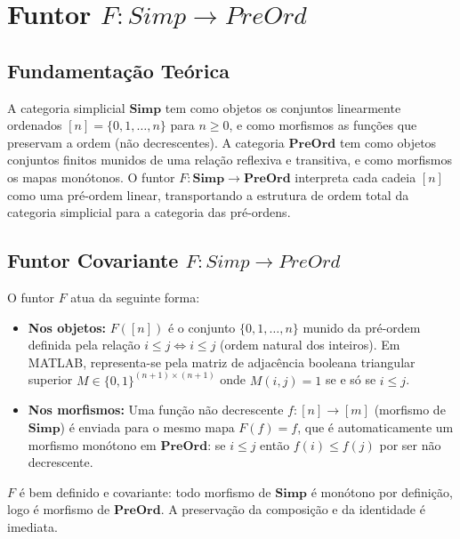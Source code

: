 \section{Funtor \texorpdfstring{$F: Simp \to PreOrd$}{F: Simp -> PreOrd}}
\label{sec:functor-simp-preord}

\subsection{Fundamentação Teórica}

A categoria simplicial $\mathbf{Simp}$ tem como objetos os conjuntos linearmente ordenados $[n] = \{0, 1, \ldots, n\}$ para $n \geq 0$, e como morfismos as funções que preservam a ordem (não decrescentes). A categoria $\mathbf{PreOrd}$ tem como objetos conjuntos finitos munidos de uma relação reflexiva e transitiva, e como morfismos os mapas monótonos. O funtor $F: \mathbf{Simp} \to \mathbf{PreOrd}$ interpreta cada cadeia $[n]$ como uma pré-ordem linear, transportando a estrutura de ordem total da categoria simplicial para a categoria das pré-ordens.

\subsection{Funtor Covariante \texorpdfstring{$F: Simp \to PreOrd$}{F: Simp -> PreOrd}}

\begin{definition}
O funtor $F$ atua da seguinte forma:
\begin{itemize}
    \item \textbf{Nos objetos:} $F([n])$ é o conjunto $\{0, 1, \ldots, n\}$ munido da pré-ordem definida pela relação $i \leq j \iff i \leq j$ (ordem natural dos inteiros). Em MATLAB, representa-se pela matriz de adjacência booleana triangular superior $M \in \{0,1\}^{(n+1) \times (n+1)}$ onde $M(i,j) = 1$ se e só se $i \leq j$.
    \item \textbf{Nos morfismos:} Uma função não decrescente $f: [n] \to [m]$ (morfismo de $\mathbf{Simp}$) é enviada para o mesmo mapa $F(f) = f$, que é automaticamente um morfismo monótono em $\mathbf{PreOrd}$: se $i \leq j$ então $f(i) \leq f(j)$ por ser não decrescente.
\end{itemize}
\end{definition}

\begin{proposition}
$F$ é bem definido e covariante: todo morfismo de $\mathbf{Simp}$ é monótono por definição, logo é morfismo de $\mathbf{PreOrd}$. A preservação da composição e da identidade é imediata.
\end{proposition}

